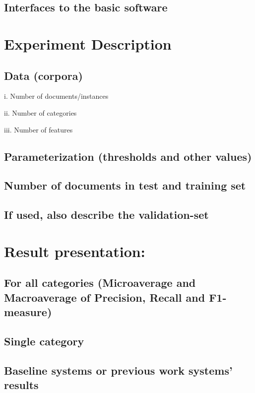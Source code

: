 \documentclass[a4paper,12pt,oneside]{article}
\begin{document}
\subsection{Interfaces to the basic software}     


\section{Experiment Description}

\subsection{Data (corpora)}

                         i.       Number of documents/instances

                        ii.      Number of categories

                      iii.      Number of features

\subsection{Parameterization (thresholds and other values)}

\subsection{Number of documents in test and training set}

\subsection{If used, also describe the validation-set}

\section{Result presentation:}

\subsection{For all categories (Microaverage and Macroaverage of Precision, Recall and F1-measure)}

\subsection{Single category}

\subsection{Baseline systems or previous work systems' results}
\end{document}
